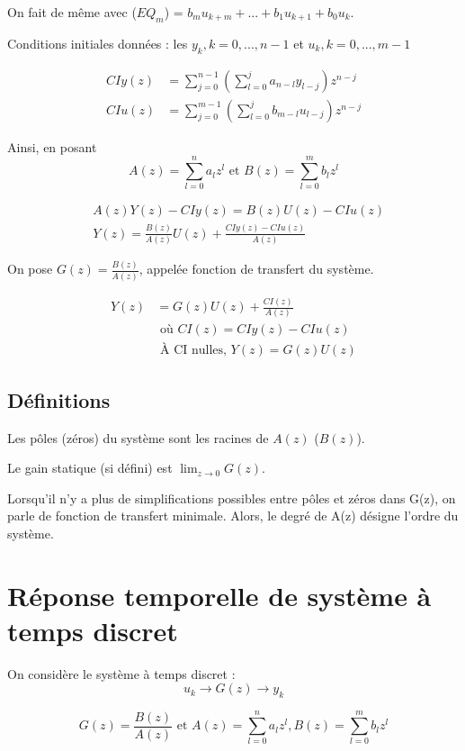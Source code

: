 \documentclass[main.tex]{subfiles}
\begin{document}
On fait de même avec ($EQ_m$) = $b_mu_{k+m} + ... + b_1u_{k+1} + b_0u_k$.

Conditions initiales données : les $y_k, k = 0,...,n-1$ et $u_k,k=0,...,m-1$

\begin{align*}
CIy(z) & = \sum_{j=0}^{n-1} ( \sum_{l=0}^j a_{n-l}y_{l-j}) z^{n-j}  \\
CIu(z) & = \sum_{j=0}^{m-1} ( \sum_{l=0}^j b_{m-l}u_{l-j}) z^{n-j}
\end{align*}

Ainsi, en posant \[A(z) = \sum_{l=0}^n a_lz^l \text{ et } B(z) = \sum_{l=0}^m b_lz^l \]

\begin{align*}
& A(z)Y(z) - CIy(z) = B(z)U(z) - CIu(z) \\
& \boxed{Y(z) = \frac{B(z)}{A(z)} U(z) + \frac{CIy(z)-CIu(z)}{A(z)}}
\end{align*}

On pose $G(z)=\frac{B(z)}{A(z)}$, appelée fonction de transfert du système.

\begin{align*}
Y(z) &  = G(z)U(z) + \frac{CI(z)}{A(z)} \\
& \text{ où } CI(z) = CIy(z) - CIu(z) \\
& \text{ À CI nulles, } Y(z) = G(z) U(z)
\end{align*}

\subsection*{Définitions}
Les pôles (zéros) du système sont les racines de $A(z)$  ($B(z)$).

Le gain statique (si défini) est \( \lim_{z\rightarrow 0}G(z)\).

Lorsqu'il n'y a plus de simplifications possibles entre pôles et zéros dans G(z), on parle de fonction de transfert minimale. Alors, le degré de A(z) désigne l'ordre du système.

\section{Réponse temporelle de système à temps discret}

On considère le système à temps discret :
\[u_k \rightarrow \boxed{G(z)} \rightarrow y_k \]

\[G(z) = \frac{B(z)}{A(z)} \text{ et } A(z) = \sum_{l=0}^n a_lz^l, B(z) = \sum_{l=0}^m b_lz^l\]
\end{document}
